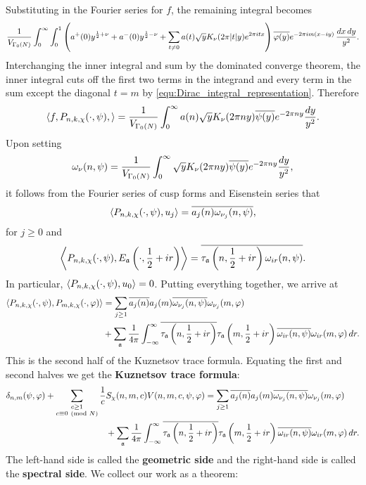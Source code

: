     Substituting in the Fourier series for $f$, the remaining integral becomes
    \[
      \frac{1}{V_{\Gamma_{0}(N)}}\int_{0}^{\infty}\int_{0}^{1}\left(a^{+}(0)y^{\frac{1}{2}+\nu}+a^{-}(0)y^{\frac{1}{2}-\nu}+\sum_{t \neq 0}a(t)\sqrt{y}K_{\nu}(2\pi|t|y)e^{2\pi itx}\right)\overline{\varphi(y)}e^{-2\pi im(x-iy)}\,\frac{dx\,dy}{y^{2}}.
    \]
    Interchanging the inner integral and sum by the dominated converge theorem, the inner integral cuts off the first two terms in the integrand and every term in the sum except the diagonal $t = m$ by \cref{equ:Dirac_integral_representation}. Therefore
    \[
      \langle f,P_{n,k,\chi}(\cdot,\psi),\rangle = \frac{1}{V_{\Gamma_{0}(N)}}\int_{0}^{\infty}a(n)\sqrt{y}K_{\nu}(2\pi ny)\overline{\psi(y)}e^{-2\pi ny}\frac{dy}{y^{2}}.
    \]
    Upon setting
    \[
      \omega_{\nu}(n,\psi) = \frac{1}{V_{\Gamma_{0}(N)}}\int_{0}^{\infty}\sqrt{y}K_{\nu}(2\pi ny)\overline{\psi(y)}e^{-2\pi ny}\frac{dy}{y^{2}},
    \]
    it follows from the Fourier series of cusp forms and Eisenstein series that
    \[
      \langle P_{n,k,\chi}(\cdot,\psi),u_{j}\rangle = \overline{a_{j}(n)\omega_{\nu_{j}}(n,\psi)},
    \]
    for $j \ge 0$ and
    \[
      \left\langle P_{n,k,\chi}(\cdot,\psi),E_{\mathfrak{a}}\left(\cdot,\frac{1}{2}+ir\right)\right\rangle = \overline{\tau_{\mathfrak{a}}\left(n,\frac{1}{2}+ir\right)\omega_{ir}(n,\psi)}.
    \]
    In particular, $\langle P_{n,k,\chi}(\cdot,\psi),u_{0}\rangle = 0$. Putting everything together, we arrive at
    \begin{align*}
      \langle P_{n,k,\chi}(\cdot,\psi),P_{m,k,\chi}(\cdot,\varphi)\rangle &= \sum_{j \ge 1}\overline{a_{j}(n)}a_{j}(m)\overline{\omega_{\nu_{j}}(n,\psi)}\omega_{\nu_{j}}(m,\varphi) \\
      &+\sum_{\mathfrak{a}}\frac{1}{4\pi}\int_{-\infty}^{\infty}\overline{\tau_{\mathfrak{a}}\left(n,\frac{1}{2}+ir\right)}\tau_{\mathfrak{a}}\left(m,\frac{1}{2}+ir\right)\overline{\omega_{ir}(n,\psi)}\omega_{ir}(m,\varphi)\,dr.
    \end{align*}
    This is the second half of the Kuznetsov trace formula. Equating the first and second halves we get the \textbf{Kuznetsov trace formula}:
    \begin{align*}
      \delta_{n,m}(\psi,\varphi)+\sum_{\substack{c \ge 1 \\ c \equiv 0 \ \left(\text{mod }N\right)}}\frac{1}{c}&S_{\chi}(n,m,c)V(n,m,c,\psi,\varphi) = \sum_{j \ge 1}\overline{a_{j}(n)}a_{j}(m)\overline{\omega_{\nu_{j}}(n,\psi)}\omega_{\nu_{j}}(m,\varphi) \\
      &+\sum_{\mathfrak{a}}\frac{1}{4\pi}\int_{-\infty}^{\infty}\overline{\tau_{\mathfrak{a}}\left(n,\frac{1}{2}+ir\right)}\tau_{\mathfrak{a}}\left(m,\frac{1}{2}+ir\right)\overline{\omega_{ir}(n,\psi)}\omega_{ir}(m,\varphi)\,dr.
    \end{align*}
    The left-hand side is called the \textbf{geometric side} and the right-hand side is called the \textbf{spectral side}. We collect our work as a theorem:

